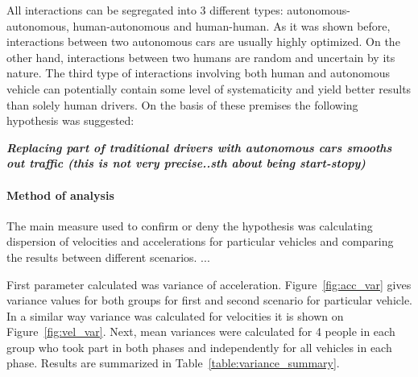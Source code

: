 \documentclass[11pt,english]{article}
\begin{document}
All interactions can be segregated into 3 different types: autonomous-autonomous, human-autonomous and human-human. As it was shown before, interactions between two autonomous cars are usually highly optimized. On the other hand, interactions between two humans are random and uncertain by its nature. The third type of interactions involving both human and autonomous vehicle can potentially contain some level of systematicity and yield better results than solely human drivers. On the basis of these premises the following hypothesis was suggested:

\textbf{\textit{Replacing part of traditional drivers with autonomous cars smooths out traffic (this is not very precise..sth about being start-stopy)}}

\paragraph{Method of analysis}
The main measure used to confirm or deny the hypothesis was calculating dispersion of velocities and accelerations for particular vehicles and comparing the results between different scenarios. ...\citep{dixon1957introduction}

First parameter calculated was variance of acceleration. Figure~\ref{fig:acc_var} gives variance values for both groups for first and second scenario for particular vehicle. In a similar way variance was calculated for velocities it is shown on Figure~\ref{fig:vel_var}. Next, mean variances were calculated for 4 people in each group who took part in both phases and independently for all vehicles in each phase. Results are summarized in Table~\ref{table:variance_summary}. 
 
\end{document}
